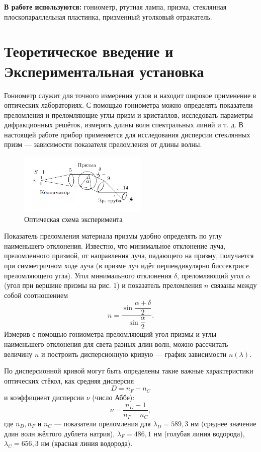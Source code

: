 \documentclass[a4paper, 12pt]{article}%
\begin{document}
\textbf{В работе используются:} гониометр, ртутная лампа, призма, стеклянная плоскопараллельная пластинка, призменный уголковый отражатель.

\section{Теоретическое введение и Экспериментальная установка} 
	Гониометр служит для точного измерения углов и находит широкое применение в оптических лабораториях. С помощью гониометра можно определять показатели преломления и преломляющие углы призм и кристаллов, исследовать параметры дифракционных решёток, измерять длины волн спектральных линий и т. д. В настоящей работе прибор применяется для исследования дисперсии стеклянных призм --- зависимости показателя преломления от длины волны.
	\begin{figure}[!h]
		\begin{center}
			\includegraphics[width = 0.55\textwidth]{pic/443-1.png}
			\caption{Оптическая схема эксперимента}
		\end{center}
	\end{figure}
	Показатель преломления материала призмы удобно определять по углу наименьшего отклонения. Известно, что минимальное отклонение луча, преломленного призмой, от направления луча, падающего на призму, получается при симметричном ходе луча (в призме луч идёт перпендикулярно биссектрисе преломляющего угла). Угол минимального отклонения $\delta$, преломляющий угол $\alpha$ (угол при вершине призмы на рис. 1) и показатель преломления $n$ связаны между собой соотношением
	\begin{equation}
	n=\dfrac{\sin\dfrac{\alpha+\delta}{2}}{\sin\dfrac{\alpha}{2}}.
	\end{equation}
	Измерив с помощью гониометра преломляющий угол призмы и углы наименьшего отклонения для света разных длин волн, можно рассчитать величину $n$ и построить дисперсионную кривую --- график зависимости $n(\lambda)$. 
	
	По дисперсионной кривой могут быть определены такие важные характеристики оптических стёкол, как средняя дисперсия
	\begin{equation}
	D = n_F - n_C
	\end{equation}
	и коэффициент дисперсии $\nu$ (число Аббе):
	\begin{equation}
	\nu = \dfrac{n_D - 1}{n_F - n_C},
	\end{equation}
	где $n_D, n_F$ и $n_C$ --- показатели преломления для $\lambda_D = 589{,}3$ нм (среднее значение длин волн жёлтого дублета натрия), $\lambda_F = 486{,}1$ нм (голубая линия водорода), $\lambda_C = 656{,}3$ нм (красная линия водорода).
	
\end{document}
